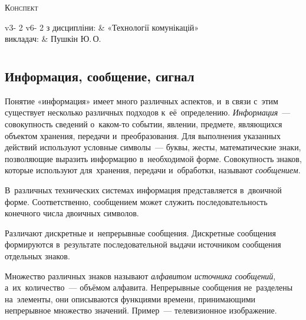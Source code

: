 \documentclass[
	a4paper,
	oneside,
	BCOR = 10mm,
	DIV = 12,
	12pt,
	headings = normal,
]{scrartcl}
\newlength{\gridunitwidth}
\newlength{\gridunitheight}
\begin{document}
\begin{titlepage}
		\vspace*{4\gridunitheight}
			\noindent\textsc{Конспект}\\[\baselineskip]
			{\setlength{\tabcolsep}{0em}
			\begin{tabular}{
					v{3\gridunitwidth - 2\tabcolsep}
					v{6\gridunitwidth - 2\tabcolsep}
			}
				з дисципліни: & «Технології комунікацій»\\
				викладач:     & Пушкін Ю.\,О.\\
			\end{tabular}
			}
		\vspace*{\fill}
	\end{titlepage}

	\tableofcontents
	\newpage

	\section{}
		\subsection{Информация, сообщение, сигнал}
			Понятие «информация» имеет много различных аспектов, и~в связи с~этим существует несколько различных подходов к~её~определению. \emph{Информация}~— совокупность сведений о~каком-то событии, явлении, предмете, являющихся объектом хранения, передачи и~преобразования. Для выполнения указанных действий используют условные символы~— буквы, жесты, математические знаки, позволяющие выразить информацию в~необходимой форме. Совокупность знаков, которые используют для~хранения, передачи и~обработки, называют \emph{сообщением}. 
			
			В~различных технических системах информация представляется в~двоичной форме. Соответственно, сообщением может служить последовательность конечного числа двоичных символов.

			Различают дискретные и~непрерывные сообщения. Дискретные сообщения формируются в~результате последовательной выдачи источником сообщения отдельных знаков.

			Множество различных знаков называют \emph{алфавитом источника сообщений}, а~их~количество~— объёмом алфавита. Непрерывные сообщения не~разделены на~элементы, они описываются функциями времени, принимающими непрерывное множество значений. Пример~— телевизионное изображение.
\end{document}

